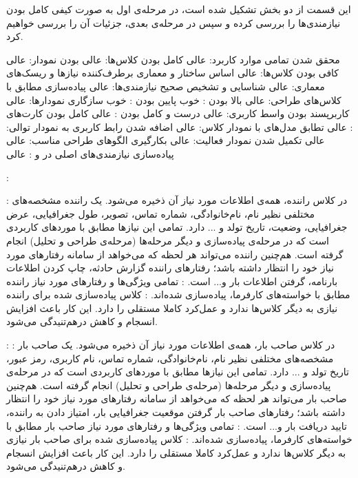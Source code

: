 
این قسمت از دو بخش تشکیل شده است، در مرحله‌ی اول به صورت کیفی کامل بودن نیازمندی‌ها را بررسی کرده و سپس در مرحله‌ی بعدی، جزئیات آن را بررسی خواهیم کرد.

  محقق شدن تمامی موارد کاربرد: عالی
  کامل بودن کلاس‌ها: عالی
   بودن نمودار: عالی
  کافی بودن کلاس‌ها: عالی
  اساس ساختار و معماری برطرف‌کننده نیاز‌ها و ریسک‌های معماری: عالی
  شناسایی و تشخیص صحیح نیازمندی‌ها: عالی
  پیاده‌سازی مطابق با کلاس‌های طراحی: عالی
  بالا بودن : خوب
  پایین بودن : خوب
  سازگاری نمودارها:‌ عالی
  کاربرپسند بودن واسط کاربری: عالی
  درست و کامل بودن : عالی
  کامل بودن کارت‌های : عالی
 تطابق مدل‌های  با نمودار کلاس: عالی
 اضافه شدن رابط کاربری به نمودار توالی: عالی
 تکمیل شدن نمودار فعالیت: عالی
 بکارگیری الگوهای طراحی مناسب: عالی
 پیاده‌سازی نیازمندی‌های اصلی در  و : عالی

\newpage
{}

	 :
	
		  :  در کلاس راننده، همه‌ی اطلاعات مورد نیاز آن ذخیره می‌شود. یک راننده مشخصه‌های مختلفی نظیر نام، نام‌خانوادگی، شماره تماس، تصویر، طول جغرافیایی، عرض جغرافیایی، وضعیت، تاریخ تولد و ... دارد. تمامی این نیازها مطابق با موردهای کاربردی است که در  مرحله‌ی پیاده‌سازی و دیگر مرحله‌ها (مرحله‌ی طراحی و تحلیل) انجام گرفته است. هم‌چنین راننده می‌تواند هر لحظه که می‌خواهد از سامانه رفتارهای مورد نیاز خود را انتظار داشته باشد؛ رفتارهای راننده گزارش حادثه، چاپ کردن اطلاعات بارنامه، گرفتن اطلاعات بار و... است.
		 : تمامی ویژگی‌ها و رفتارهای مورد نیاز راننده مطابق با خواسته‌های کارفرما، پیاده‌سازی شده‌اند.
		 : کلاس‌ پیاده‌سازی شده برای راننده نیازی به دیگر کلاس‌ها ندارد و عمل‌کرد کاملا مستقلی را دارد. این کار باعث افزایش انسجام و کاهش درهم‌تنیدگی  می‌شود.
	
	\newpage
	
	 :
	  : در کلاس صاحب‌ بار، همه‌ی اطلاعات مورد نیاز آن ذخیره می‌شود. یک صاحب بار مشخصه‌های مختلفی نظیر نام، نام‌خانوادگی، شماره تماس، نام کاربری، رمز عبور، تاریخ تولد و ... دارد. تمامی این نیازها مطابق با موردهای کاربردی است که در مرحله‌ی پیاده‌سازی و دیگر مرحله‌ها (مرحله‌ی طراحی و تحلیل) انجام گرفته است. هم‌چنین صاحب بار می‌تواند هر لحظه که می‌خواهد از سامانه رفتارهای مورد نیاز خود را انتظار داشته باشد؛ رفتارهای صاحب بار گرفتن موقعیت جغرافیایی بار، امتیاز دادن به راننده، تایید دریافت بار و... است.
	 : تمامی ویژگی‌ها و رفتارهای مورد نیاز صاحب بار مطابق با خواسته‌های کارفرما، پیاده‌سازی شده‌اند.
	 : کلاس‌ پیاده‌سازی شده برای صاحب بار نیازی به دیگر کلاس‌ها ندارد و عمل‌کرد کاملا مستقلی را دارد. این کار باعث افزایش انسجام و کاهش درهم‌تنیدگی می‌شود.
	
